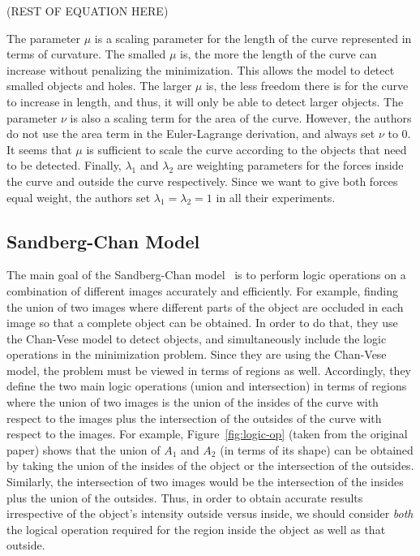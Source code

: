 \documentclass[10pt,twocolumn,letterpaper]{article}
\begin{document}
(REST OF EQUATION HERE)

The parameter $\mu$ is a scaling parameter for the length of the curve represented in terms of curvature. The smalled $\mu$ is, the more the length of the curve
can increase without penalizing the minimization. This allows the model to detect smalled objects and holes. The larger $\mu$ is, the less freedom there is for
the curve to increase in length, and thus, it will only be able to detect larger objects. The parameter $\nu$ is also a scaling term for the area of the curve.
However, the authors do not use the area term in the Euler-Lagrange derivation, and always set $\nu$ to 0. It seems that $\mu$ is sufficient to scale the curve
according to the objects that need to be detected. Finally, $\lambda_{1}$ and $\lambda_{2}$ are weighting parameters for the forces inside the curve and
outside the curve respectively. Since we want to give both forces equal weight, the authors set $\lambda_{1} = \lambda_{2} = 1$ in all their experiments.



\subsection{Sandberg-Chan Model}
\label{sec:sandberg-chan}

The main goal of the Sandberg-Chan model~\cite{sandberg2005logic} is to perform logic operations on a combination of different images accurately and
efficiently. For example, finding the union of two images where different parts of the object are occluded in each image so that a complete object can be
obtained. In order to do that, they use the Chan-Vese model to detect objects, and simultaneously include the logic operations in the minimization problem.
Since they are using the Chan-Vese model, the problem must be viewed in terms of regions as well. Accordingly, they define the two main logic operations
(union and intersection) in terms of regions where the union of two images is the union of the insides of the curve with respect to the images plus the
intersection of the outsides of the curve with respect to the images. For example, Figure~\ref{fig:logic-op} (taken from the original paper) shows that the
union of $A_{1}$ and $A_{2}$ (in terms of its shape) can be obtained by taking the union of the insides of the object or the intersection of the outsides.
Similarly, the intersection of two images would be the intersection of the insides plus the union of the outsides. Thus, in order to obtain accurate results
irrespective of the object's intensity outside versus inside, we should consider \textit{both} the logical operation required for the region inside the object
as well as that outside.
\end{document}
